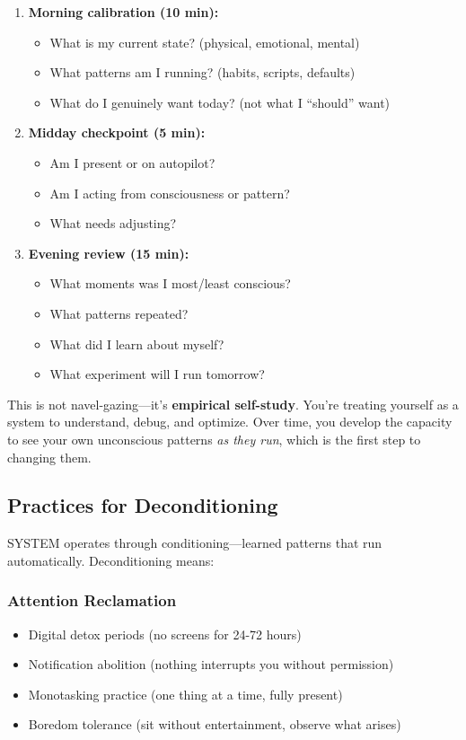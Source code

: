 \documentclass[11pt,a4paper]{article}
\theoremstyle{definition}
\theoremstyle{remark}
\begin{document}
\begin{enumerate}
    \item \textbf{Morning calibration (10 min):}
    \begin{itemize}
        \item What is my current state? (physical, emotional, mental)
        \item What patterns am I running? (habits, scripts, defaults)
        \item What do I genuinely want today? (not what I ``should'' want)
    \end{itemize}
    
    \item \textbf{Midday checkpoint (5 min):}
    \begin{itemize}
        \item Am I present or on autopilot?
        \item Am I acting from consciousness or pattern?
        \item What needs adjusting?
    \end{itemize}
    
    \item \textbf{Evening review (15 min):}
    \begin{itemize}
        \item What moments was I most/least conscious?
        \item What patterns repeated?
        \item What did I learn about myself?
        \item What experiment will I run tomorrow?
    \end{itemize}
\end{enumerate}

This is not navel-gazing---it's \textbf{empirical self-study}. You're treating yourself as a system to understand, debug, and optimize. Over time, you develop the capacity to see your own unconscious patterns \textit{as they run}, which is the first step to changing them.

\subsection{Practices for Deconditioning}

SYSTEM operates through conditioning---learned patterns that run automatically. Deconditioning means:

\subsubsection{Attention Reclamation}
\begin{itemize}
    \item Digital detox periods (no screens for 24-72 hours)
    \item Notification abolition (nothing interrupts you without permission)
    \item Monotasking practice (one thing at a time, fully present)
    \item Boredom tolerance (sit without entertainment, observe what arises)
\end{itemize}
\end{document}
